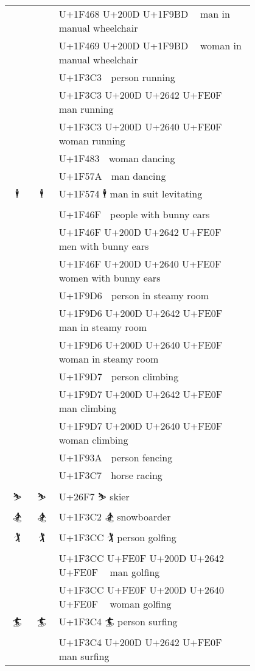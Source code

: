 \documentclass[a4paper,12pt]{ltjarticle}
\newcommand{\fontA}[1]{{\fontspec[RawFeature={mode=harf,+dist,+ccmp}]{Segoe UI Emoji} #1}}
\newcommand{\fontB}[1]{{\fontspec[RawFeature={mode=harf,+dist,+ccmp}]{Noto Color Emoji} #1}}
\begin{document}
\begin{longtable}[c]{ccp{0.8\linewidth}}
\fontA{👨‍🦽}&\fontB{👨‍🦽}&U+1F468 U+200D U+1F9BD 👨‍🦽 man in manual wheelchair\\
\fontA{👩‍🦽}&\fontB{👩‍🦽}&U+1F469 U+200D U+1F9BD 👩‍🦽 woman in manual wheelchair\\
\fontA{🏃}&\fontB{🏃}&U+1F3C3 🏃 person running\\
\fontA{🏃‍♂️}&\fontB{🏃‍♂️}&U+1F3C3 U+200D U+2642 U+FE0F 🏃‍♂️ man running\\
\fontA{🏃‍♀️}&\fontB{🏃‍♀️}&U+1F3C3 U+200D U+2640 U+FE0F 🏃‍♀️ woman running\\
\fontA{💃}&\fontB{💃}&U+1F483 💃 woman dancing\\
\fontA{🕺}&\fontB{🕺}&U+1F57A 🕺 man dancing\\
\fontA{🕴}&\fontB{🕴}&U+1F574 🕴 man in suit levitating\\
\fontA{👯}&\fontB{👯}&U+1F46F 👯 people with bunny ears\\
\fontA{👯‍♂️}&\fontB{👯‍♂️}&U+1F46F U+200D U+2642 U+FE0F 👯‍♂️ men with bunny ears\\
\fontA{👯‍♀️}&\fontB{👯‍♀️}&U+1F46F U+200D U+2640 U+FE0F 👯‍♀️ women with bunny ears\\
\fontA{🧖}&\fontB{🧖}&U+1F9D6 🧖 person in steamy room\\
\fontA{🧖‍♂️}&\fontB{🧖‍♂️}&U+1F9D6 U+200D U+2642 U+FE0F 🧖‍♂️ man in steamy room\\
\fontA{🧖‍♀️}&\fontB{🧖‍♀️}&U+1F9D6 U+200D U+2640 U+FE0F 🧖‍♀️ woman in steamy room\\
\fontA{🧗}&\fontB{🧗}&U+1F9D7 🧗 person climbing\\
\fontA{🧗‍♂️}&\fontB{🧗‍♂️}&U+1F9D7 U+200D U+2642 U+FE0F 🧗‍♂️ man climbing\\
\fontA{🧗‍♀️}&\fontB{🧗‍♀️}&U+1F9D7 U+200D U+2640 U+FE0F 🧗‍♀️ woman climbing\\
\fontA{🤺}&\fontB{🤺}&U+1F93A 🤺 person fencing\\
\fontA{🏇}&\fontB{🏇}&U+1F3C7 🏇 horse racing\\
\fontA{⛷}&\fontB{⛷}&U+26F7 ⛷ skier\\
\fontA{🏂}&\fontB{🏂}&U+1F3C2 🏂 snowboarder\\
\fontA{🏌}&\fontB{🏌}&U+1F3CC 🏌 person golfing\\
\fontA{🏌️‍♂️}&\fontB{🏌️‍♂️}&U+1F3CC U+FE0F U+200D U+2642 U+FE0F 🏌️‍♂️ man golfing\\
\fontA{🏌️‍♀️}&\fontB{🏌️‍♀️}&U+1F3CC U+FE0F U+200D U+2640 U+FE0F 🏌️‍♀️ woman golfing\\
\fontA{🏄}&\fontB{🏄}&U+1F3C4 🏄 person surfing\\
\fontA{🏄‍♂️}&\fontB{🏄‍♂️}&U+1F3C4 U+200D U+2642 U+FE0F 🏄‍♂️ man surfing\\

\end{longtable}
\end{document}
